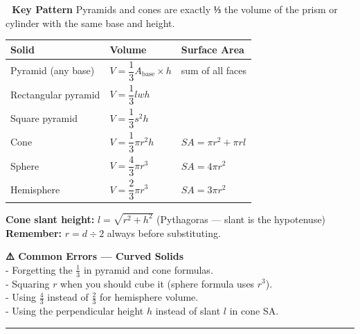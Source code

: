 \documentclass[
  letterpaper,
  DIV=11,
  numbers=noendperiod]{scrreprt}
\theoremstyle{definition}
\theoremstyle{remark}
\begin{document}
\textbf{🎯 Key Pattern} Pyramids and cones are exactly \textbf{⅓} the
volume of the prism or cylinder with the same base and height.

\begin{longtable}[]{@{}
  >{\raggedright\arraybackslash}p{}
  >{\raggedright\arraybackslash}p{}
  >{\raggedright\arraybackslash}p{}@{}}
\toprule\noalign{}
\begin{minipage}[b]{\linewidth}\raggedright
Solid
\end{minipage} & \begin{minipage}[b]{\linewidth}\raggedright
Volume
\end{minipage} & \begin{minipage}[b]{\linewidth}\raggedright
Surface Area
\end{minipage} \\
\midrule\noalign{}
\endhead
\bottomrule\noalign{}
\endlastfoot
Pyramid (any base) & \(V = \dfrac{1}{3} A_{\text{base}} \times h\) & sum
of all faces \\
Rectangular pyramid & \(V = \dfrac{1}{3} lwh\) & \\
Square pyramid & \(V = \dfrac{1}{3} s^2 h\) & \\
Cone & \(V = \dfrac{1}{3}\pi r^2 h\) & \(SA = \pi r^2 + \pi r l\) \\
Sphere & \(V = \dfrac{4}{3}\pi r^3\) & \(SA = 4\pi r^2\) \\
Hemisphere & \(V = \dfrac{2}{3}\pi r^3\) & \(SA = 3\pi r^2\) \\
\end{longtable}

\textbf{Cone slant height:} \(l = \sqrt{r^2 + h^2}\) (Pythagoras ---
slant is the hypotenuse)\\
\textbf{Remember:} \(r = d \div 2\) always before substituting.

\textbf{⚠️ Common Errors --- Curved Solids}\\
- Forgetting the \(\tfrac{1}{3}\) in pyramid and cone formulas.\\
- Squaring \(r\) when you should cube it (sphere formula uses
\(r^3\)).\\
- Using \(\tfrac{4}{3}\) instead of \(\tfrac{2}{3}\) for hemisphere
volume.\\
- Using the perpendicular height \(h\) instead of slant \(l\) in cone
SA.

\begin{center}\rule{0.5\linewidth}{0.5pt}\end{center}
\end{document}
